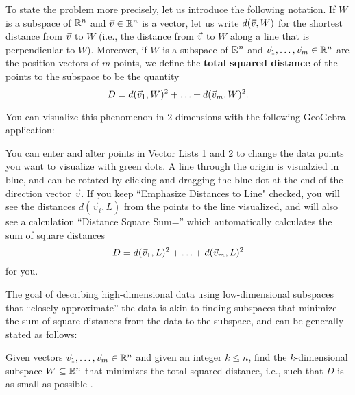 \documentclass{ximera}
\begin{document}
To state the problem more precisely, let us introduce the following
notation. If $W$ is a subspace of $\mathbb{R}^n$ and $\vec{v}\in\mathbb{R}^n$ is a
vector, let us write $d(\vec{v},W)$ for the shortest distance from
$\vec{v}$ to $W$ (i.e., the distance from $\vec{v}$ to $W$ along a
line that is perpendicular to $W$). Moreover, if $W$ is a subspace of
$\mathbb{R}^n$ and $\vec{v}_1,\ldots,\vec{v}_m\in\mathbb{R}^n$ are the position
vectors of $m$ points, we define the \textbf{total squared distance}%
%
%
%
 of the points to
the subspace to be the quantity
\begin{equation*}
  D = d(\vec{v}_1,W)^2 + \ldots + d(\vec{v}_m,W)^2.
\end{equation*}

You can visualize this phenomenon in $2$-dimensions with the following GeoGebra application:

\begin{center}
\end{center}

You can enter and alter points in Vector Lists 1 and 2 to change the data points you want to visualize with green dots. A line through the origin is visualzied in blue, and can be rotated by clicking and dragging the blue dot at the end of the direction vector $\vec{v}$. If you keep ``Emphasize Distances to Line" checked, you will see the distances $d(\vec{v}_i,L)$ from the points to the line visualized, and will also see a calculation ``Distance Square Sum='' which automatically calculates the sum of square distances \begin{equation*}
  D = d(\vec{v}_1,L)^2 + \ldots + d(\vec{v}_m,L)^2
\end{equation*} for you.

The goal of describing high-dimensional data using low-dimensional subspaces that ``closely approximate'' the data is akin to finding subspaces that minimize the sum of square distances from the data to the subspace, and can be generally stated as follows:
 
\begin{problem}\label{prop:subspace-fitting}

  Given vectors $\vec{v}_1,\ldots,\vec{v}_m\in\mathbb{R}^n$ and given an
  integer $k\leq n$, find the $k$-dimensional subspace
  $W\subseteq\mathbb{R}^n$ that minimizes the total squared distance, i.e.,
  such that $D$ is as small as possible%
  .
\end{problem}
\end{document}
